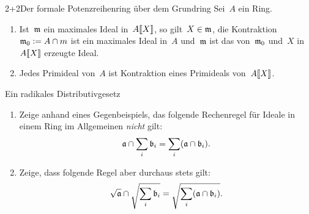 \documentclass[entwurf]{uebblatt}
\begin{document}

\begin{aufgabe}{2+2}{Der formale Potenzreihenring über dem Grundring}
Sei~$A$ ein Ring.
\begin{enumerate}
\item Ist~$\mathfrak{m}$ ein maximales Ideal in~${A}\llbracket{X}\rrbracket$, so gilt~$X \in \mathfrak{m}$, die
Kontraktion~$\mathfrak{m}_0 \vcentcolon= A \cap m$ ist ein maximales Ideal in~$A$ und~$\mathfrak{m}$
ist das von~$\mathfrak{m}_0$ und~$X$ in~${A}\llbracket{X}\rrbracket$ erzeugte Ideal.
\item Jedes Primideal von~$A$ ist Kontraktion eines Primideals von~${A}\llbracket{X}\rrbracket$.
\end{enumerate}
\end{aufgabe}

\begin{aufgabe}{}{Ein radikales Distributivgesetz}
\begin{enumerate}
\item Zeige anhand eines Gegenbeispiels, das folgende Rechenregel für Ideale in
einem Ring im Allgemeinen \emph{nicht} gilt:
\[ \mathfrak{a} \cap \sum_i \mathfrak{b}_i = \sum_i (\mathfrak{a} \cap \mathfrak{b}_i). \]
\item Zeige, dass folgende Regel aber durchaus stets gilt:
\[ \sqrt{\mathfrak{a}} \cap \sqrt{\sum_i \mathfrak{b}_i} = \sqrt{\sum_i (\mathfrak{a} \cap \mathfrak{b}_i)}. \]
\end{enumerate}
\end{aufgabe}
\end{document}
